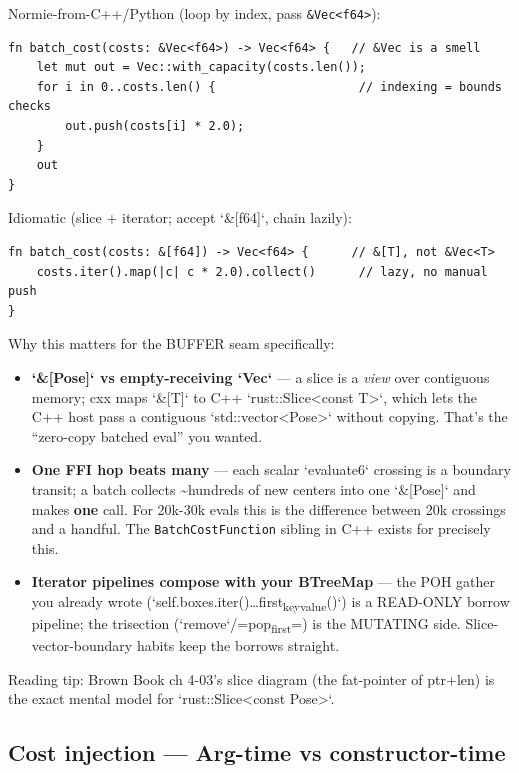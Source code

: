 \documentclass[11pt]{article}
\begin{document}
Normie-from-C++/Python (loop by index, pass \texttt{\&Vec<f64>}):

\begin{verbatim}
fn batch_cost(costs: &Vec<f64>) -> Vec<f64> {   // &Vec is a smell
    let mut out = Vec::with_capacity(costs.len());
    for i in 0..costs.len() {                    // indexing = bounds checks
        out.push(costs[i] * 2.0);
    }
    out
}
\end{verbatim}

Idiomatic (slice + iterator; accept `\&[f64]`, chain lazily):

\begin{verbatim}
fn batch_cost(costs: &[f64]) -> Vec<f64> {      // &[T], not &Vec<T>
    costs.iter().map(|c| c * 2.0).collect()      // lazy, no manual push
}
\end{verbatim}

Why this matters for the BUFFER seam specifically:

\begin{itemize}
\item \textbf{\textbf{`\&[Pose]` vs empty-receiving `Vec`}} — a slice is a \emph{view} over contiguous
memory; cxx maps `\&[T]` to C++ `rust::Slice<const T>`, which lets the C++
host pass a contiguous `std::vector<Pose>` without copying. That's the
``zero-copy batched eval'' you wanted.
\item \textbf{\textbf{One FFI hop beats many}} — each scalar `evaluate6` crossing is a boundary
transit; a batch collects \textasciitilde{}hundreds of new centers into one `\&[Pose]` and
makes \textbf{\textbf{one}} call. For 20k-30k evals this is the difference between 20k
crossings and a handful. The \texttt{BatchCostFunction} sibling in C++ exists for
precisely this.
\item \textbf{\textbf{Iterator pipelines compose with your BTreeMap}} — the POH gather you
already wrote (`self.boxes.iter()\ldots{}first\textsubscript{key}\textsubscript{value}()`) is a READ-ONLY
borrow pipeline; the trisection (`remove`/=pop\textsubscript{first}=) is the MUTATING side.
Slice-vector-boundary habits keep the borrows straight.
\end{itemize}

Reading tip: Brown Book ch 4-03's slice diagram (the fat-pointer of ptr+len)
is the exact mental model for `rust::Slice<const Pose>`.
\subsection{Cost injection — Arg-time vs constructor-time}
\label{sec:org24d74b3}
\end{document}
